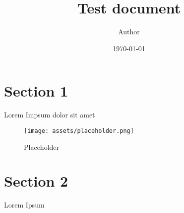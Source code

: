 \documentclass[11pt]{article}
\title{ Test document}
\author{ Author }
\date{\today}
\begin{document}
\maketitle
\pagebreak

\tableofcontents
\pagebreak


\section{Section 1}

Lorem Impsum dolor sit amet

\begin{figure}[h]
    \centering
    \texttt{[image: assets/placeholder.png]}
    \caption{Placeholder}
\end{figure}

\pagebreak
\section{Section 2}
Lorem Ipsum \\

\end{document}
